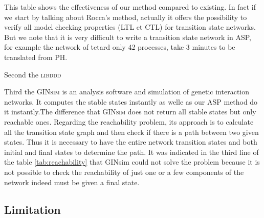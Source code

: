 This table shows the effectiveness of our method compared to existing. In fact if we start by talking about Rocca's method, actually it offers the possibility to verify all model checking properties (LTL et CTL) for transition state networks. But we note that it is very difficult to write a transition state network in ASP, for example the network of tetard \cite{khalis2009smbionet} only 42 processes, take 3 minutes to be translated from PH. 

Second the \textsc{libddd} 

Third the \textsc{GINsim} is an analysis software and simulation of genetic interaction networks. It computes the stable states instantly as welle as our ASP method do it instantly.The difference that \textsc{GINsim} does not return all stable states but only reachable ones. Regarding the reachability problem, its approach is to calculate all the transition state graph and then check if there is a path between two given states. Thus it is necessary to have the entire network transition states and both initial and final states to determine the path. It was indicated in the third line of the table \ref{tab:reachability} that GINsim could not solve the problem because it is not possible to check the reachability of just one or a few components of the network indeed must be given a final state.



\subsection{Limitation}